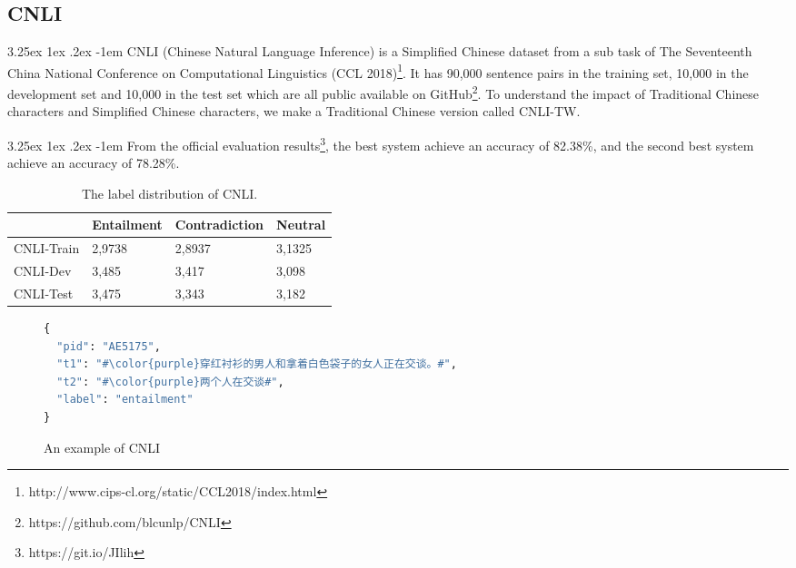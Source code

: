 \documentclass[12pt]{article}
\makeatletter
\renewcommand\paragraph{\@startsection{paragraph}{5}{\z@}%
  {3.25ex \@plus1ex \@minus.2ex}%
  {-1em}%
  {\normalfont\normalsize\bfseries}}
\makeatother
\begin{document}
\begin{CJK*}{UTF8}{bkai}
\begin{spacing}{1.77}
\subsection{CNLI}
\paragraph{}
CNLI (Chinese Natural Language Inference) is a Simplified Chinese dataset from a sub task of The Seventeenth China National Conference on Computational Linguistics (CCL 2018)\footnote{http://www.cips-cl.org/static/CCL2018/index.html}. It has 90,000 sentence pairs in the training set, 10,000 in the development set and 10,000 in the test set which are all public available on GitHub\footnote{https://github.com/blcunlp/CNLI}. To understand the impact of Traditional Chinese characters and Simplified Chinese characters, we make a Traditional Chinese version called CNLI-TW.

\paragraph{}
From the official evaluation results\footnote{https://git.io/JIlih}, the best system achieve an accuracy of 82.38\%, and the second best system achieve an accuracy of 78.28\%.

\begin{table}[H]
  \centering
  \setlength{\extrarowheight}{-3pt}
  \begin{tabular}{|l|R{3cm}|R{3cm}|R{3cm}|}
  \hline
             & Entailment & Contradiction & Neutral \\ \hline
  CNLI-Train & 2,9738     & 2,8937        & 3,1325  \\ \hline
  CNLI-Dev   & 3,485      & 3,417         & 3,098   \\ \hline
  CNLI-Test  & 3,475      & 3,343         & 3,182   \\ \hline
  \end{tabular}
  \caption{The label distribution of CNLI.}

\end{table}

\begin{figure}
\caption{An example of CNLI}
\begin{CJK*}{UTF8}{gbsn}
\begin{lstlisting}[language=Python, escapechar=\#]
{
  "pid": "AE5175",
  "t1": "#\color{purple}穿红衬衫的男人和拿着白色袋子的女人正在交谈。#",
  "t2": "#\color{purple}两个人在交谈#",
  "label": "entailment"
}
\end{lstlisting}
\end{CJK*}
\end{figure}


\end{spacing}
\end{CJK*}
\end{document}
